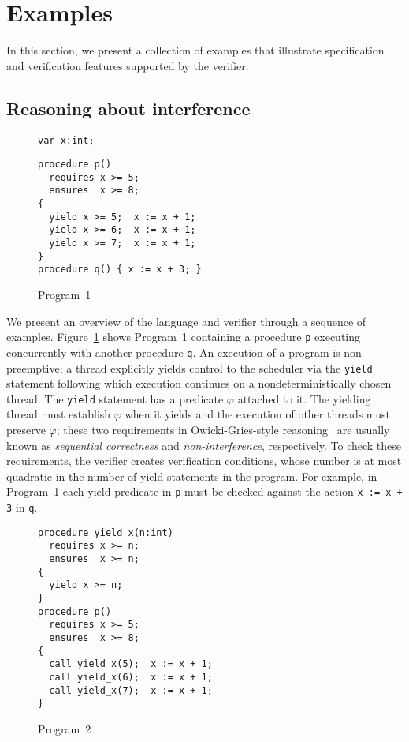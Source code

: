 \section{Examples}
\label{sec:examples}

In this section, we present a collection of examples that illustrate
specification and verification features supported by the \civl verifier.
\subsection{Reasoning about interference}
\label{sec:examples-interference}
\begin{figure}
\begin{verbatim}
var x:int;
\end{verbatim}
\begin{verbatim}
procedure p()
  requires x >= 5;
  ensures  x >= 8;
{
  yield x >= 5;  x := x + 1;
  yield x >= 6;  x := x + 1;
  yield x >= 7;  x := x + 1;
}
procedure q() { x := x + 3; }
\end{verbatim}
\caption{Program~1}
\label{fig:ex1}
\end{figure}

We present an overview of the \civl language and verifier through a sequence of examples.
Figure~\ref{fig:ex1} shows Program~1 containing a procedure {\tt p}
executing concurrently with another procedure {\tt q}. 
An execution of a \civl program is non-preemptive; a thread explicitly yields control to the
scheduler via the {\tt yield} statement following which execution continues on a 
nondeterministically chosen thread.
The {\tt yield} statement has a predicate $\varphi$ attached to it.
The yielding thread must establish $\varphi$ when it yields and the execution of other threads 
must preserve $\varphi$; these two requirements in Owicki-Gries-style
reasoning~\cite{OwickiG76} are usually known as {\em sequential correctness}
and {\em non-interference}, respectively.
To check these requirements, the \civl verifier creates verification conditions, whose number is at most
quadratic in the number of yield statements in the program.
For example, in Program~1 each yield predicate in {\tt p} must be checked against the action 
{\tt x := x + 3} in {\tt q}.

\begin{figure}
\begin{verbatim}
procedure yield_x(n:int)
  requires x >= n;
  ensures  x >= n;
{
  yield x >= n;
}
procedure p()
  requires x >= 5;
  ensures  x >= 8;
{
  call yield_x(5);  x := x + 1;
  call yield_x(6);  x := x + 1;
  call yield_x(7);  x := x + 1;
}
\end{verbatim}
\caption{Program~2}
\label{fig:ex2}
\end{figure}

